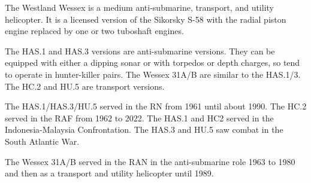 

The Westland Wessex is a medium anti-submarine, transport, and utility helicopter. It is a licensed version of the Sikorsky S-58 with the radial piston engine replaced by one or two tuboshaft engines.

The HAS.1 and HAS.3 versions are anti-submarine versions. They can be equipped with either a dipping sonar or with torpedos or depth charges, so tend to operate in hunter-killer pairs. The Wessex 31A/B are similar to the HAS.1/3. The HC.2 and HU.5 are transport versions.

The HAS.1/HAS.3/HU.5 served in the RN from 1961 until about 1990. The HC.2 served in the RAF from 1962 to 2022. The HAS.1 and HC2 served in the Indonesia-Malaysia Confrontation. The HAS.3 and HU.5 saw combat in the South Atlantic War.

The Wessex 31A/B served in the RAN in the anti-submarine role 1963 to 1980 and then as a transport and utility helicopter until 1989.
